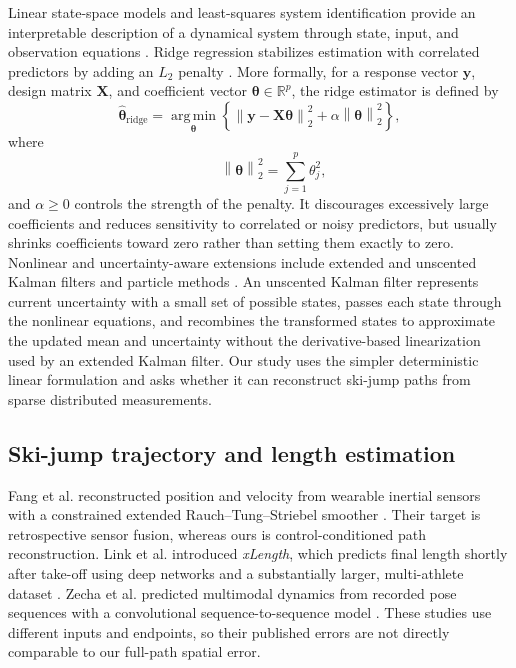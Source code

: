 \documentclass[11pt,twoside,a4paper]{article}
\begin{document}
Linear state-space models and least-squares system identification provide an interpretable description of a dynamical system through state, input, and observation equations \cite{aoki1990state,ljung1999system,bjorck1996least}. Ridge regression stabilizes estimation with correlated predictors by adding an $L_2$ penalty \cite{hoerl1970ridge}. More formally, for a response vector $\mathbf{y}$, design matrix $\mathbf{X}$, and coefficient vector $\boldsymbol{\theta}\in\mathbb{R}^{p}$, the ridge estimator is defined by
\[
\widehat{\boldsymbol{\theta}}_{\mathrm{ridge}}
=
\operatorname*{arg\,min}_{\boldsymbol{\theta}}
\left\{
\left\lVert
\mathbf{y}-\mathbf{X}\boldsymbol{\theta}
\right\rVert_2^2
+
\alpha\left\lVert\boldsymbol{\theta}\right\rVert_2^2
\right\},
\]
where
\[
\qquad
\left\lVert\boldsymbol{\theta}\right\rVert_2^2
=
\sum_{j=1}^{p}\theta_j^2,
\]
and $\alpha\geq 0$ controls the strength of the penalty. It discourages excessively large coefficients and reduces sensitivity to correlated or noisy predictors, but usually shrinks coefficients toward zero rather than setting them exactly to zero. Nonlinear and uncertainty-aware extensions include extended and unscented Kalman filters and particle methods \cite{sarkka2013bayesian}. An unscented Kalman filter represents current uncertainty with a small set of possible states, passes each state through the nonlinear equations, and recombines the transformed states to approximate the updated mean and uncertainty without the derivative-based linearization used by an extended Kalman filter. Our study uses the simpler deterministic linear formulation and asks whether it can reconstruct ski-jump paths from sparse distributed measurements.

\subsection{Ski-jump trajectory and length estimation}

Fang et al. reconstructed position and velocity from wearable inertial sensors with a constrained extended Rauch--Tung--Striebel smoother \cite{fang2020trajectory}. Their target is retrospective sensor fusion, whereas ours is control-conditioned path reconstruction. Link et al. introduced \textit{xLength}, which predicts final length shortly after take-off using deep networks and a substantially larger, multi-athlete dataset \cite{schwinn2022xlength}. Zecha et al. predicted multimodal dynamics from recorded pose sequences with a convolutional sequence-to-sequence model \cite{zecha2018convolutional}. These studies use different inputs and endpoints, so their published errors are not directly comparable to our full-path spatial error.
\end{document}
